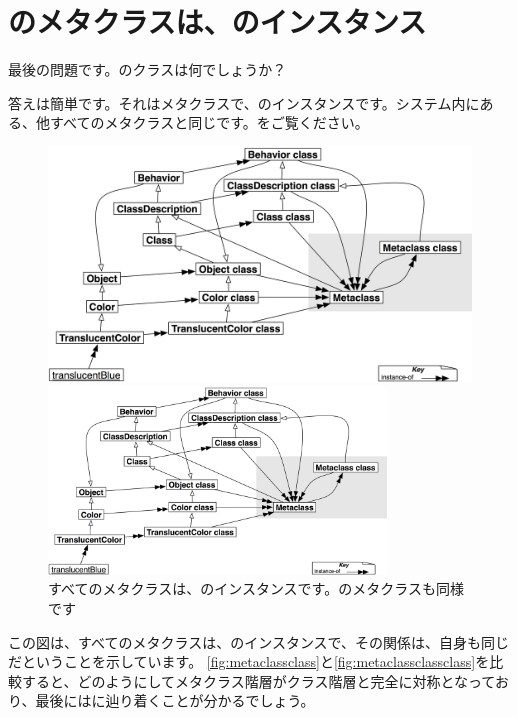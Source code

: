 \documentclass[a4paper,10pt,twoside]{book}
\begin{document}
\section{のメタクラスは、のインスタンス}

最後の問題です。のクラスは何でしょうか？

答えは簡単です。それはメタクラスで、のインスタンスです。システム内にある、他すべてのメタクラスと同じです。をご覧ください。

\begin{center}
\begin{figure}
\ifluluelse
	{\centerline{\includegraphics[width=\textwidth]{TranslucentMetaclassClassClass}}}
	{\centerline{\includegraphics[width=0.8\textwidth]{TranslucentMetaclassClassClass}}}
\caption{すべてのメタクラスは、のインスタンスです。のメタクラスも同様です}
\end{figure}
\end{center}

この図は、すべてのメタクラスは、のインスタンスで、その関係は、自身も同じだということを示しています。
\ref{fig:metaclassclass}と\ref{fig:metaclassclassclass}を比較すると、どのようにしてメタクラス階層がクラス階層と完全に対称となっており、最後にはに辿り着くことが分かるでしょう。
\end{document}
